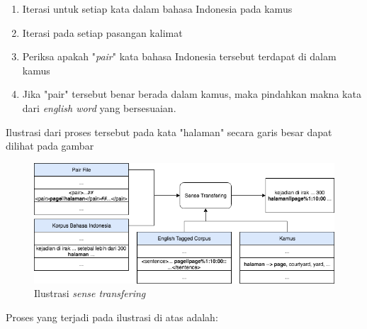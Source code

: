 \begin{enumerate}
	\item Iterasi untuk setiap kata dalam bahasa Indonesia pada kamus
	\item Iterasi pada setiap pasangan kalimat
	\item Periksa apakah "\textit{pair}" kata bahasa Indonesia tersebut terdapat di dalam kamus
	\item Jika "pair" tersebut benar berada dalam kamus, maka pindahkan makna kata dari \textit{english word} yang bersesuaian.
\end{enumerate}

Ilustrasi dari proses tersebut pada kata "halaman" secara garis besar dapat dilihat pada gambar 


\begin{figure}
	\centering
	\includegraphics[width=1\linewidth]{adit_pics/sense-transfering}
	\caption{Ilustrasi \textit{sense transfering}}
	\label{fig:ilustrasi-sense-transfering}
\end{figure}

Proses yang terjadi pada ilustrasi di atas adalah:

